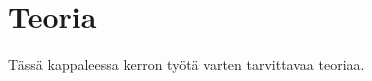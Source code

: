 \section{Teoria}

Tässä kappaleessa kerron työtä varten tarvittavaa teoriaa.



\clearpage


\clearpage


\clearpage
